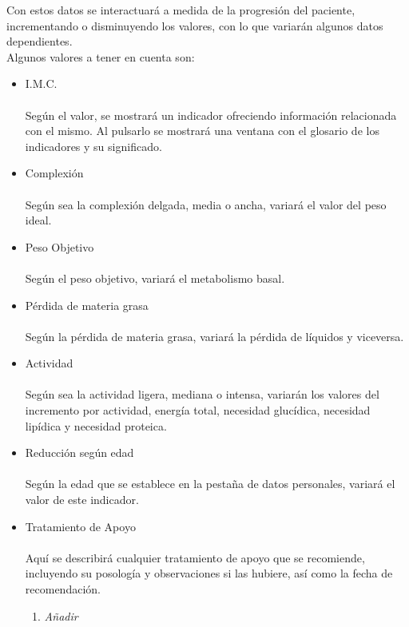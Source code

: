 Con estos datos se interactuará a medida de la progresión del paciente, incrementando o disminuyendo los valores, con lo que variarán algunos datos dependientes.\\
Algunos valores a tener en cuenta son:
\begin{itemize}
\item I.M.C.\\\\
Según el valor, se mostrará un indicador ofreciendo información relacionada con el mismo. Al pulsarlo se mostrará una ventana con el glosario de los indicadores y su significado.\\
\item Complexión\\\\
Según sea la complexión delgada, media o ancha, variará el valor del peso ideal.\\
\item Peso Objetivo\\\\
Según el peso objetivo, variará el metabolismo basal.\\
\item Pérdida de materia grasa\\\\
Según la pérdida de materia grasa, variará la pérdida de líquidos y viceversa.\\
\item Actividad\\\\
Según sea la actividad ligera, mediana o intensa, variarán los valores del incremento por actividad, energía total, necesidad glucídica, necesidad lipídica y necesidad proteica.\\
\item Reducción según edad\\\\
Según la edad que se establece en la pestaña de datos personales, variará el valor de este indicador.\\
\item Tratamiento de Apoyo\\\\
Aquí se describirá cualquier tratamiento de apoyo que se recomiende, incluyendo su posología y observaciones si las hubiere, así como la fecha de recomendación.\\
\begin{enumerate}
\item \textit{Añadir}\\\\

\end{enumerate}
\end{itemize}
